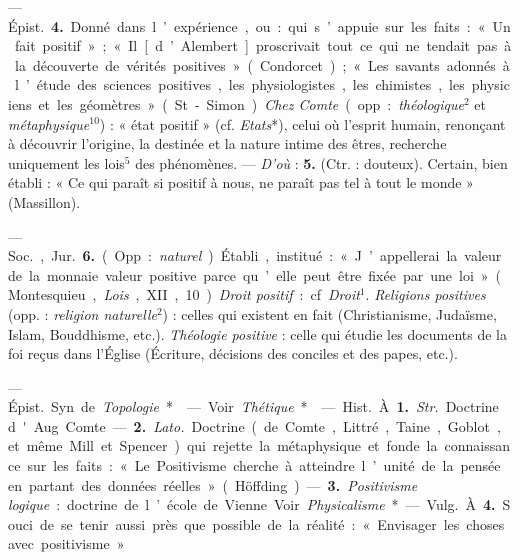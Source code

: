 \begin{itemize}[leftmargin=1cm, label=, itemsep=1pt]
— \si{Épist.} {\bf 4.} Donné dans l’expérience, ou : qui s’appuie sur les
faits : « Un fait positif » ; « Il [d’Alembert] proscrivait tout ce qui ne
tendait pas à la découverte de vérités positives » (Condorcet) ; « Les
savants adonnés à l’étude des sciences positives, les physiologistes, les
chimistes, les physiciens et les géomètres » (St-Simon). {\it Chez Comte}
(opp. : {\it théologique}$^2$ et {\it métaphysique}$^{10}$) : « état positif
» (cf. {\it Etats}*), celui où l’esprit humain, renonçant à découvrir
l’origine, la destinée et la nature intime des êtres, recherche uniquement
les lois$^5$ des phénomènes. — {\it D'où} : {\bf 5.} (Ctr. : douteux).
Certain, bien établi : « Ce qui paraît si positif à nous, ne paraît pas tel à
tout le monde » (Massillon).

— \si{Soc.}, \si{Jur.} {\bf 6.} (Opp. : {\it naturel}). Établi, institué : «
J’appellerai la valeur de la monnaie valeur positive parce qu’elle peut être
fixée par une loi » (Montesquieu, {\it Lois}, XII, 10). {\it Droit positif} :
cf. {\it Droit}$^1$. {\it Religions positives} (opp. : {\it religion
naturelle}$^2$) : celles qui existent en fait (Christianisme, Judaïsme,
Islam, Bouddhisme, etc.). {\it Théologie positive} : celle qui étudie les
documents de la foi reçus dans l’Église (Écriture, décisions des conciles et
des papes, etc.).

 — \si{Épist.} Syn. de {\it Topologie}*.

 — Voir {\it Thétique}*.

 — \si{Hist.} À. {\bf 1.} {\it Str.} Doctrine d'Aug. Comte. —
{\bf 2.} {\it Lato.} Doctrine (de Comte, Littré, Taine, Goblot, et même Mill
et Spencer) qui rejette la métaphysique et fonde la connaissance sur les
faits : « Le Positivisme cherche à atteindre l’unité de la pensée en partant
des données réelles » (Höffding). —  {\bf 3.} {\it Positivisme logique} :
doctrine de l’école de Vienne. Voir {\it Physicalisme}*

— \si{Vulg.} À. {\bf 4.} Souci de se tenir aussi près que possible de la
réalité : « Envisager les choses avec positivisme. »


\end{itemize}
